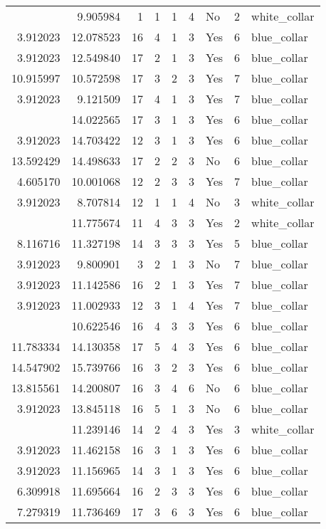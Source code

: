 \documentclass[
]{article}
\begin{document}
\begin{longtable}[t]{rrrrrllrl}
\addlinespace
3.912023 & 9.905984 & 1 & 1 & 1 & 4 & No & 2 & white\_collar\\
3.912023 & 12.078523 & 16 & 4 & 1 & 3 & Yes & 6 & blue\_collar\\
3.912023 & 12.549840 & 17 & 2 & 1 & 3 & Yes & 6 & blue\_collar\\
10.915997 & 10.572598 & 17 & 3 & 2 & 3 & Yes & 7 & blue\_collar\\
3.912023 & 9.121509 & 17 & 4 & 1 & 3 & Yes & 7 & blue\_collar\\
\addlinespace
3.912023 & 14.022565 & 17 & 3 & 1 & 3 & Yes & 6 & blue\_collar\\
3.912023 & 14.703422 & 12 & 3 & 1 & 3 & Yes & 6 & blue\_collar\\
13.592429 & 14.498633 & 17 & 2 & 2 & 3 & No & 6 & blue\_collar\\
4.605170 & 10.001068 & 12 & 2 & 3 & 3 & Yes & 7 & blue\_collar\\
3.912023 & 8.707814 & 12 & 1 & 1 & 4 & No & 3 & white\_collar\\
\addlinespace
5.521461 & 11.775674 & 11 & 4 & 3 & 3 & Yes & 2 & white\_collar\\
8.116716 & 11.327198 & 14 & 3 & 3 & 3 & Yes & 5 & blue\_collar\\
3.912023 & 9.800901 & 3 & 2 & 1 & 3 & No & 7 & blue\_collar\\
3.912023 & 11.142586 & 16 & 2 & 1 & 3 & Yes & 7 & blue\_collar\\
3.912023 & 11.002933 & 12 & 3 & 1 & 4 & Yes & 7 & blue\_collar\\
\addlinespace
11.156965 & 10.622546 & 16 & 4 & 3 & 3 & Yes & 6 & blue\_collar\\
11.783334 & 14.130358 & 17 & 5 & 4 & 3 & Yes & 6 & blue\_collar\\
14.547902 & 15.739766 & 16 & 3 & 2 & 3 & Yes & 6 & blue\_collar\\
13.815561 & 14.200807 & 16 & 3 & 4 & 6 & No & 6 & blue\_collar\\
3.912023 & 13.845118 & 16 & 5 & 1 & 3 & No & 6 & blue\_collar\\
\addlinespace
4.382027 & 11.239146 & 14 & 2 & 4 & 3 & Yes & 3 & white\_collar\\
3.912023 & 11.462158 & 16 & 3 & 1 & 3 & Yes & 6 & blue\_collar\\
3.912023 & 11.156965 & 14 & 3 & 1 & 3 & Yes & 6 & blue\_collar\\
6.309918 & 11.695664 & 16 & 2 & 3 & 3 & Yes & 6 & blue\_collar\\
7.279319 & 11.736469 & 17 & 3 & 6 & 3 & Yes & 6 & blue\_collar\\

\end{longtable}
\end{document}
